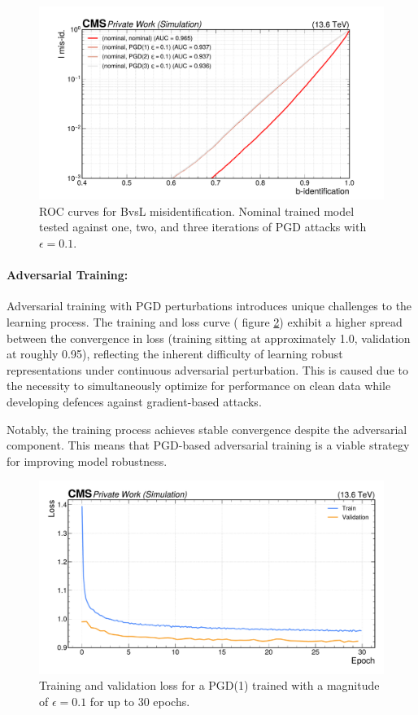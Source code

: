 \begin{figure}[h]
\centering
    \includegraphics[width=15cm]{media/output/roc_bvsl_pgd_its_1_2_3.pdf}
    \caption{ROC curves for BvsL misidentification. Nominal trained model tested against one, two, and three iterations of PGD attacks with $\epsilon=0.1$.}
    \label{fig:pgd_iterations}
\end{figure}

\paragraph{Adversarial Training:} Adversarial training with PGD perturbations introduces unique challenges to the learning process. The training and loss curve ( figure \ref{fig:pgd_loss_curve}) exhibit a higher spread between the convergence in loss (training sitting at approximately 1.0, validation at roughly 0.95), reflecting the inherent difficulty of learning robust representations under continuous adversarial perturbation. This is caused due to the necessity to simultaneously optimize for performance on clean data while developing defences against gradient-based attacks.

Notably, the training process achieves stable convergence despite the adversarial component. This means that PGD-based adversarial training is a viable strategy for improving model robustness.

\begin{figure}[h]
\centering
    
    \includegraphics[width=15cm]{media/output/pgd_loss_validation.pdf}
    \caption{Training and validation loss for a PGD(1) trained with a magnitude of $\epsilon=0.1$ for up to 30 epochs.}
    \label{fig:pgd_loss_curve}
\end{figure}

